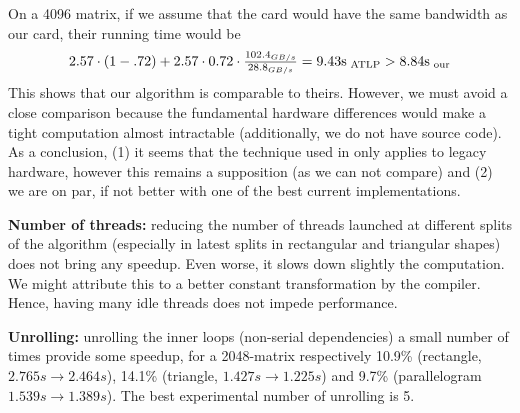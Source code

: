 \item On a 4096 matrix, if we assume that the \cite{gpu_atlp} card would have the same bandwidth as our card, their running time would be
\[2.57 \cdot (1-.72) + 2.57 \cdot 0.72 \cdot \tfrac{102.4_{GB/s}}{28.8_{GB/s}} = 9.43\rm s_{\text{ ATLP}} > 8.84\rm s_{\text{ our}}\]
This shows that our algorithm is comparable to theirs. However, we must avoid a close comparison because the fundamental hardware differences would make a tight computation almost intractable (additionally, we do not have \cite{gpu_atlp} source code).
\ule
As a conclusion, (1) it seems that the technique used in \cite{gpu_atlp} only applies to legacy hardware, however this remains a supposition (as we can not compare) and (2) we are on par, if not better with one of the best current implementations.

\item \textbf{Number of threads:} reducing the number of threads launched at different splits of the algorithm (especially in latest splits in rectangular and triangular shapes) does not bring any speedup. Even worse, it slows down slightly the computation. We might attribute this to a better constant transformation by the compiler. Hence, having many idle threads does not impede performance.

\item \textbf{Unrolling:} unrolling the inner loops (non-serial dependencies) a small number of times provide some speedup, for a 2048-matrix respectively 10.9\% (rectangle, $2.765s\to 2.464s$), 14.1\% (triangle, $1.427s\to 1.225s$) and 9.7\% (parallelogram $1.539s\to 1.389s$). The best experimental number of unrolling is 5.
\ule

